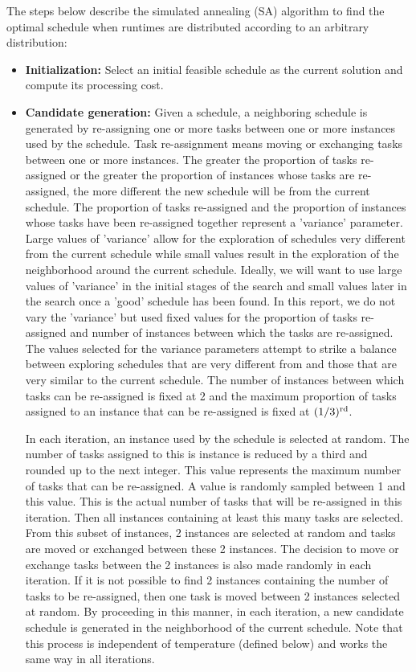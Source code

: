 \documentclass[12pt]{report}
\begin{document}
The steps below describe the simulated annealing (SA) algorithm to find the optimal schedule when runtimes are distributed according to an arbitrary distribution:
\begin{itemize}
	\item \textbf{Initialization:} Select an initial feasible schedule as the current solution and compute its processing cost.
	\item \textbf{Candidate generation:} 
		Given a schedule, a neighboring schedule is generated by re-assigning one or more tasks between one or more instances used by the schedule.
		Task re-assignment means moving or exchanging tasks between one or more instances.
		The greater the proportion of tasks re-assigned or the greater the proportion of instances whose tasks are re-assigned, the more different the new schedule will be from the current schedule.
		The proportion of tasks re-assigned and the proportion of instances whose tasks have been re-assigned together represent a 'variance' parameter. 
		Large values of 'variance' allow for the exploration of schedules very different from the current schedule while small values result in the exploration of the neighborhood around the current schedule.
		Ideally, we will want to use large values of 'variance' in the initial stages of the search and small values later in the search once a 'good' schedule has been found.
		In this report, we do not vary the 'variance' but used fixed values for the proportion of tasks re-assigned and number of instances between which the tasks are re-assigned.
		The values selected for the variance parameters attempt to strike a balance between exploring schedules that are very different from and those that are very similar to the current schedule.
		The number of instances between which tasks can be re-assigned is fixed at 2 and the maximum proportion of tasks assigned to an instance that can be re-assigned is fixed at $(1/3)\textsuperscript{rd}$.

		In each iteration, an instance used by the schedule is selected at random.
		The number of tasks assigned to this is instance is reduced by a third and rounded up to the next integer.
		This value represents the maximum number of tasks that can be re-assigned.
		A value is randomly sampled between 1 and this value.
		This is the actual number of tasks that will be re-assigned in this iteration.
		Then all instances containing at least this many tasks are selected.
		From this subset of instances, 2 instances are selected at random and tasks are moved or exchanged between these 2 instances.
		The decision to move or exchange tasks between the 2 instances is also made randomly in each iteration.
		If it is not possible to find 2 instances containing the number of tasks to be re-assigned, then one task is moved between 2 instances selected at random.
		By proceeding in this manner, in each iteration, a new candidate schedule is generated in the neighborhood of the current schedule.
		Note that this process is independent of temperature (defined below) and works the same way in all iterations.
		

\end{itemize}
\end{document}
